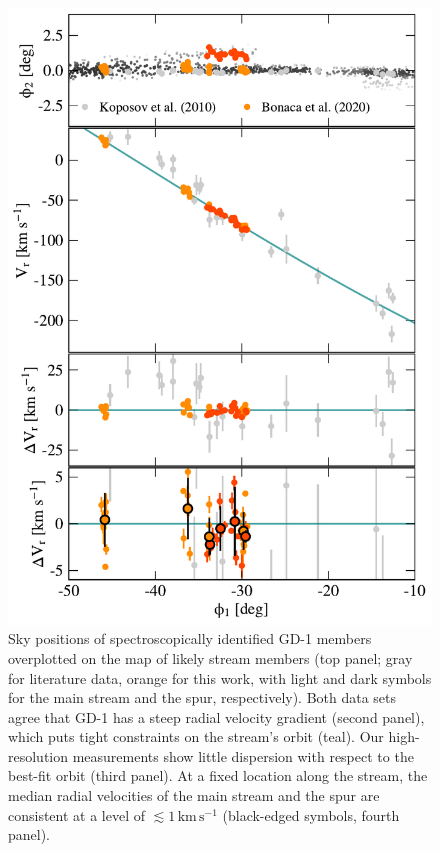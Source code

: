 \documentclass[twocolumn]{aastex63}
\newcommand{\kms}{\ensuremath{\textrm{km}\,\textrm{s}^{-1}}}
\begin{document}
\begin{figure}
\begin{center}
\includegraphics[width=0.99\columnwidth]{gd1_kinematics.pdf}
\end{center}
\caption{Sky positions of spectroscopically identified GD-1 members overplotted on the map of likely stream members (top panel; gray for literature data, orange for this work, with light and dark symbols for the main stream and the spur, respectively).
Both data sets agree that GD-1 has a steep radial velocity gradient (second panel), which puts tight constraints on the stream's orbit (teal).
Our high-resolution measurements show little dispersion with respect to the best-fit orbit (third panel).
At a fixed location along the stream, the median radial velocities of the main stream and the spur are consistent at a level of $\lesssim1\,\kms$ (black-edged symbols, fourth panel).
}
\label{fig:vr}
\end{figure}
\end{document}
